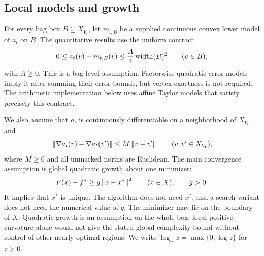\subsection{Local models and growth}
For every bag box $B\subseteq X_{V_t}$, let $m_{t,B}$ be a supplied
continuous convex lower model of $a_t$ on $B$. The quantitative results use
the uniform contract
\begin{equation}\label{eq:model-contract}
 0\le a_t(v)-m_{t,B}(v)\le \frac A4\operatorname{width}(B)^2
 \qquad(v\in B),
\end{equation}
with $A\ge0$. This is a bag-level assumption. Factorwise quadratic-error
models imply it after summing their error bounds, but vertex exactness is
not required. The arithmetic implementation below uses affine Taylor
models that satisfy precisely this contract.

We also assume that $a_t$ is continuously differentiable on a neighborhood
of $X_{V_t}$ and
\begin{equation}\label{eq:model-smooth}
 \left\lVert \nabla a_t(v)-\nabla a_t(v')\right\rVert\le M\left\lVert v-v'\right\rVert
 \qquad(v,v'\in X_{V_t}),
\end{equation}
where $M\ge0$ and all unmarked norms are Euclidean. The main convergence
assumption is global quadratic growth about one minimizer:
\begin{equation}\label{eq:model-growth}
 F(x)-f^*\ge g\left\lVert x-x^*\right\rVert^2\qquad(x\in X),\qquad g>0.
\end{equation}
It implies that $x^*$ is unique. The algorithm does not need $x^*$, and a
search variant does not need the numerical value of $g$. The minimizer may
lie on the boundary of $X$. Quadratic growth is an assumption on the whole
box; local positive curvature alone would not give the stated global
complexity bound without control of other nearly optimal regions.
We write $\log_+z=\max\{0,\log z\}$ for $z>0$.

